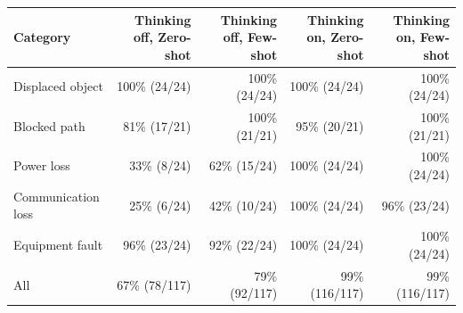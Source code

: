 \begin{tabular}{lrrrr}
\toprule
Category & Thinking off, Zero-shot & Thinking off, Few-shot & Thinking on, Zero-shot & Thinking on, Few-shot \\
\midrule
Displaced object & 100\% (24/24) & 100\% (24/24) & 100\% (24/24) & 100\% (24/24) \\
Blocked path & 81\% (17/21) & 100\% (21/21) & 95\% (20/21) & 100\% (21/21) \\
Power loss & 33\% (8/24) & 62\% (15/24) & 100\% (24/24) & 100\% (24/24) \\
Communication loss & 25\% (6/24) & 42\% (10/24) & 100\% (24/24) & 96\% (23/24) \\
Equipment fault & 96\% (23/24) & 92\% (22/24) & 100\% (24/24) & 100\% (24/24) \\
All & 67\% (78/117) & 79\% (92/117) & 99\% (116/117) & 99\% (116/117) \\
\bottomrule
\end{tabular}
